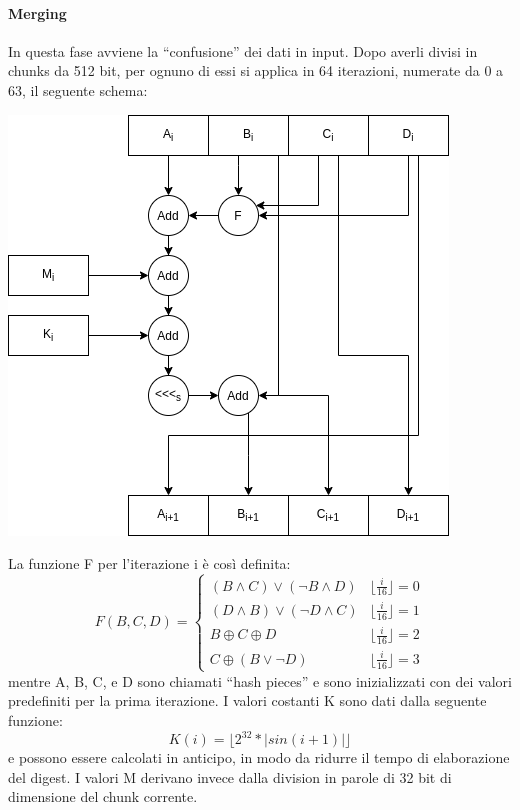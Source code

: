 \documentclass{article}
\begin{document}
\paragraph{Merging} In questa fase avviene la ``confusione'' dei dati in input. Dopo averli divisi in chunks da 512 bit, per ognuno di essi si applica in 64 iterazioni, numerate da 0 a 63, il seguente schema:
\begin{center}
    \includegraphics[scale=0.50]{../images/md5.png}
\end{center}
La funzione F per l'iterazione i è così definita:
\begin{equation*}
    F(B, C, D) = \left\{
    \begin{array}{ll}
        (B \land  C) \lor (\lnot B \land D) & \lfloor \frac{i}{16} \rfloor = 0 \\
        (D \land  B) \lor (\lnot D \land C) & \lfloor \frac{i}{16} \rfloor = 1 \\
        B \oplus   C \oplus D               & \lfloor \frac{i}{16} \rfloor = 2 \\
        C \oplus (B \lor \lnot D)           & \lfloor \frac{i}{16} \rfloor = 3
    \end{array}
    \right.
\end{equation*}
mentre A, B, C, e D sono chiamati ``hash pieces'' e sono inizializzati con dei valori predefiniti per la prima iterazione. I valori costanti K sono dati dalla seguente funzione:
$$
    K(i) = \lfloor 2^{32} * \left\lvert sin(i + 1) \right\rvert  \rfloor
$$
e possono essere calcolati in anticipo, in modo da ridurre il tempo di elaborazione del digest. I valori M derivano invece dalla division in parole di 32 bit di dimensione del chunk corrente.
\end{document}
